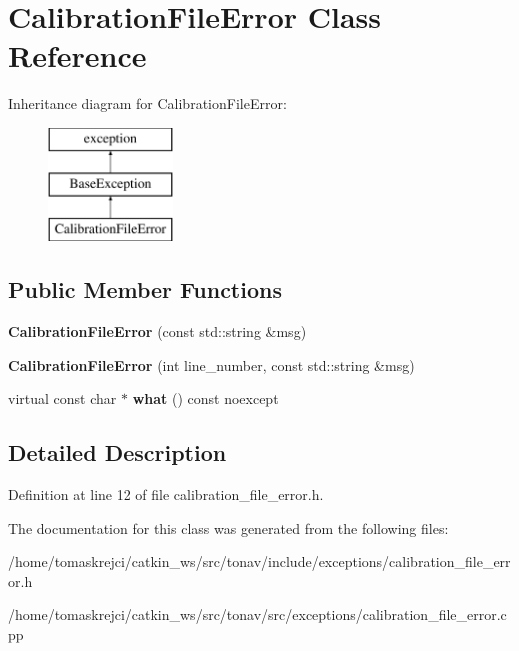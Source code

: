 \hypertarget{class_calibration_file_error}{\section{Calibration\-File\-Error Class Reference}
\label{class_calibration_file_error}
}
Inheritance diagram for Calibration\-File\-Error\-:\begin{figure}[H]
\begin{center}
\leavevmode
\includegraphics[height=3.000000cm]{class_calibration_file_error}
\end{center}
\end{figure}
\subsection*{Public Member Functions}
\begin{DoxyCompactItemize}
\item 
\hypertarget{class_calibration_file_error_ac4403a65bb13617f6f9aaea23a408c0a}{{\bfseries Calibration\-File\-Error} (const std\-::string \&msg)}\label{class_calibration_file_error_ac4403a65bb13617f6f9aaea23a408c0a}

\item 
\hypertarget{class_calibration_file_error_a91d41fb29208c4304760a251de8ca50a}{{\bfseries Calibration\-File\-Error} (int line\-\_\-number, const std\-::string \&msg)}\label{class_calibration_file_error_a91d41fb29208c4304760a251de8ca50a}

\item 
\hypertarget{class_calibration_file_error_a935a4e242a42bb1ab4867c05f44eebc9}{virtual const char $\ast$ {\bfseries what} () const noexcept}\label{class_calibration_file_error_a935a4e242a42bb1ab4867c05f44eebc9}

\end{DoxyCompactItemize}


\subsection{Detailed Description}


Definition at line 12 of file calibration\-\_\-file\-\_\-error.\-h.



The documentation for this class was generated from the following files\-:\begin{DoxyCompactItemize}
\item 
/home/tomaskrejci/catkin\-\_\-ws/src/tonav/include/exceptions/calibration\-\_\-file\-\_\-error.\-h\item 
/home/tomaskrejci/catkin\-\_\-ws/src/tonav/src/exceptions/calibration\-\_\-file\-\_\-error.\-cpp\end{DoxyCompactItemize}
